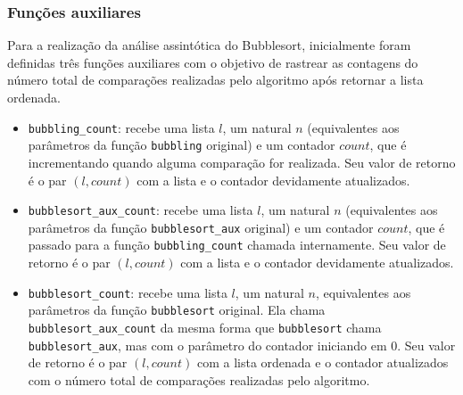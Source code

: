 \subsubsection{Funções auxiliares}

Para a realização da análise assintótica do Bubblesort,
inicialmente foram definidas três funções auxiliares
com o objetivo de rastrear as contagens do número total
de comparações realizadas pelo algoritmo após retornar
a lista ordenada.

\begin{itemize}
\item \texttt{bubbling\_count}: recebe uma lista $l$, um
natural $n$ (equivalentes aos parâmetros da função
\texttt{bubbling} original) e um contador $count$, que é
incrementando quando alguma comparação for realizada.
Seu valor de retorno é o par $(l, count)$ com a lista e
o contador devidamente atualizados.
\item \texttt{bubblesort\_aux\_count}: recebe uma lista $l$,
um natural $n$ (equivalentes aos parâmetros da função
\texttt{bubblesort\_aux} original) e um contador $count$,
que é passado para a função \texttt{bubbling\_count}
chamada internamente. Seu valor de retorno é o par
$(l, count)$ com a lista e o contador devidamente
atualizados.
\item \texttt{bubblesort\_count}: recebe uma lista $l$,
um natural $n$, equivalentes aos parâmetros da função
\texttt{bubblesort} original. Ela chama
\texttt{bubblesort\_aux\_count} da mesma forma que
\texttt{bubblesort} chama \texttt{bubblesort\_aux},
mas com o parâmetro do contador iniciando em 0. Seu valor
de retorno é o par $(l, count)$ com a lista ordenada
e o contador atualizados com o número total de comparações
realizadas pelo algoritmo.
\end{itemize}

